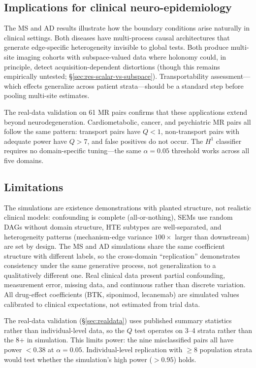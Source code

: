 \documentclass{article}
\begin{document}
\subsection{Implications for clinical neuro-epidemiology}

The MS and AD results illustrate how the boundary conditions arise naturally in clinical settings.
Both diseases have multi-process causal architectures that generate edge-specific heterogeneity invisible to global tests.
Both produce multi-site imaging cohorts with subspace-valued data where holonomy could, in principle, detect acquisition-dependent distortions (though this remains empirically untested; \S\ref{sec:res-scalar-vs-subspace}).
Transportability assessment---which effects generalize across patient strata---should be a standard step before pooling multi-site estimates.

The real-data validation on 61 MR pairs confirms that these applications extend beyond neurodegeneration.
Cardiometabolic, cancer, and psychiatric MR pairs all follow the same pattern: transport pairs have $Q < 1$, non-transport pairs with adequate power have $Q > 7$, and false positives do not occur. The $H^1$ classifier requires no domain-specific tuning---the same $\alpha = 0.05$ threshold works across all five domains.

\subsection{Limitations}

The simulations are existence demonstrations with planted structure, not realistic clinical models: confounding is complete (all-or-nothing), SEMs use random DAGs without domain structure, HTE subtypes are well-separated, and heterogeneity patterns (mechanism-edge variance $100\times$ larger than downstream) are set by design.
The MS and AD simulations share the same coefficient structure with different labels, so the cross-domain ``replication'' demonstrates consistency under the same generative process, not generalization to a qualitatively different one.
Real clinical data present partial confounding, measurement error, missing data, and continuous rather than discrete variation.
All drug-effect coefficients (BTK, siponimod, lecanemab) are simulated values calibrated to clinical expectations, not estimated from trial data.

The real-data validation (\S\ref{sec:realdata}) uses published summary statistics rather than individual-level data, so the $Q$ test operates on 3--4 strata rather than the 8+ in simulation.
This limits power: the nine misclassified pairs all have power $< 0.38$ at $\alpha = 0.05$.
Individual-level replication with $\geq 8$ population strata would test whether the simulation's high power ($> 0.95$) holds.
\end{document}
